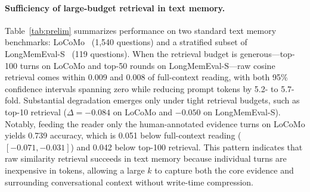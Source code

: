 \documentclass[10pt]{article}
\begin{document}
\paragraph{Sufficiency of large-budget retrieval in text memory.} Table~\ref{tab:prelim} summarizes performance on two standard text memory benchmarks: LoCoMo~\citep{maharana2024locomo} (1,540 questions) and a stratified subset of LongMemEval-S~\citep{wu2025longmemeval} (119 questions). When the retrieval budget is generous—top-100 turns on LoCoMo and top-50 rounds on LongMemEval-S—raw cosine retrieval comes within 0.009 and 0.008 of full-context reading, with both 95\% confidence intervals spanning zero while reducing prompt tokens by 5.2- to 5.7-fold. Substantial degradation emerges only under tight retrieval budgets, such as top-10 retrieval ($\Delta = -0.084$ on LoCoMo and $-0.050$ on LongMemEval-S). Notably, feeding the reader only the human-annotated evidence turns on LoCoMo yields 0.739 accuracy, which is 0.051 below full-context reading ($[-0.071, -0.031]$) and 0.042 below top-100 retrieval. This pattern indicates that raw similarity retrieval succeeds in text memory because individual turns are inexpensive in tokens, allowing a large $k$ to capture both the core evidence and surrounding conversational context without write-time compression.
\end{document}
